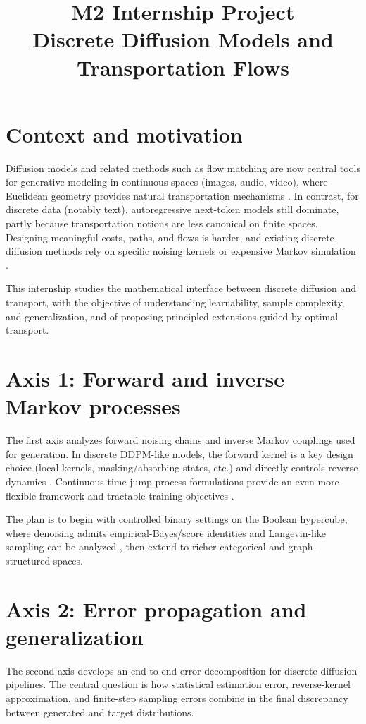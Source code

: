 \documentclass[11pt]{article}
\title{M2 Internship Project\\
Discrete Diffusion Models and Transportation Flows}
\author{}
\date{}
\begin{document}
\maketitle

\section{Context and motivation}
Diffusion models and related methods such as flow matching are now central tools for generative modeling in continuous spaces (images, audio, video), where Euclidean geometry provides natural transportation mechanisms \citep{ho2020ddpm,lipman2022flowmatching}.
In contrast, for discrete data (notably text), autoregressive next-token models still dominate, partly because transportation notions are less canonical on finite spaces.
Designing meaningful costs, paths, and flows is harder, and existing discrete diffusion methods rely on specific noising kernels or expensive Markov simulation \citep{austin2021d3pm,campbell2022ctmc}.

This internship studies the mathematical interface between discrete diffusion and transport, with the objective of understanding learnability, sample complexity, and generalization, and of proposing principled extensions guided by optimal transport.

\section{Axis 1: Forward and inverse Markov processes}
The first axis analyzes forward noising chains and inverse Markov couplings used for generation.
In discrete DDPM-like models, the forward kernel is a key design choice (local kernels, masking/absorbing states, etc.) and directly controls reverse dynamics \citep{austin2021d3pm}.
Continuous-time jump-process formulations provide an even more flexible framework and tractable training objectives \citep{campbell2022ctmc}.

The plan is to begin with controlled binary settings on the Boolean hypercube, where denoising admits empirical-Bayes/score identities and Langevin-like sampling can be analyzed \citep{bach2025binary}, then extend to richer categorical and graph-structured spaces.

\section{Axis 2: Error propagation and generalization}
The second axis develops an end-to-end error decomposition for discrete diffusion pipelines.
The central question is how statistical estimation error, reverse-kernel approximation, and finite-step sampling errors combine in the final discrepancy between generated and target distributions.
\end{document}

